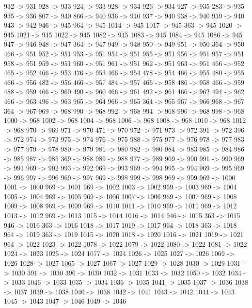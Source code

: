 {	932 -> 931
	928 -> 933
	924 -> 933
	928 -> 934
	926 -> 934
	927 -> 935
	283 -> 935
	935 -> 936
	807 -> 940
	866 -> 940
	936 -> 940
	937 -> 940
	938 -> 940
	939 -> 940
	943 -> 942
	946 -> 945
	964 -> 945
	1014 -> 945
	1017 -> 945
	363 -> 945
	1020 -> 945
	1021 -> 945
	1022 -> 945
	1082 -> 945
	1083 -> 945
	1084 -> 945
	1086 -> 945
	947 -> 946
	948 -> 947
	364 -> 947
	949 -> 948
	950 -> 949
	951 -> 950
	364 -> 950
	466 -> 951
	952 -> 951
	953 -> 951
	954 -> 951
	955 -> 951
	956 -> 951
	957 -> 951
	958 -> 951
	959 -> 951
	960 -> 951
	961 -> 951
	962 -> 951
	963 -> 951
	466 -> 952
	465 -> 952
	466 -> 953
	476 -> 953
	466 -> 954
	478 -> 954
	466 -> 955
	480 -> 955
	466 -> 956
	482 -> 956
	466 -> 957
	484 -> 957
	466 -> 958
	486 -> 958
	466 -> 959
	488 -> 959
	466 -> 960
	490 -> 960
	466 -> 961
	492 -> 961
	466 -> 962
	494 -> 962
	466 -> 963
	496 -> 963
	965 -> 964
	966 -> 965
	364 -> 965
	967 -> 966
	968 -> 967
	364 -> 967
	969 -> 968
	990 -> 968
	992 -> 968
	994 -> 968
	996 -> 968
	998 -> 968
	1000 -> 968
	1002 -> 968
	1004 -> 968
	1006 -> 968
	1008 -> 968
	1010 -> 968
	1012 -> 968
	970 -> 969
	971 -> 970
	471 -> 970
	972 -> 971
	973 -> 972
	391 -> 972
	396 -> 972
	974 -> 973
	975 -> 974
	976 -> 975
	988 -> 975
	977 -> 976
	978 -> 977
	983 -> 977
	979 -> 978
	980 -> 979
	981 -> 980
	982 -> 980
	984 -> 983
	985 -> 984
	986 -> 985
	987 -> 985
	369 -> 988
	989 -> 988
	977 -> 989
	969 -> 990
	991 -> 990
	969 -> 991
	969 -> 992
	993 -> 992
	969 -> 993
	969 -> 994
	995 -> 994
	969 -> 995
	969 -> 996
	997 -> 996
	969 -> 997
	969 -> 998
	999 -> 998
	969 -> 999
	969 -> 1000
	1001 -> 1000
	969 -> 1001
	969 -> 1002
	1003 -> 1002
	969 -> 1003
	969 -> 1004
	1005 -> 1004
	969 -> 1005
	969 -> 1006
	1007 -> 1006
	969 -> 1007
	969 -> 1008
	1009 -> 1008
	969 -> 1009
	969 -> 1010
	1011 -> 1010
	969 -> 1011
	969 -> 1012
	1013 -> 1012
	969 -> 1013
	1015 -> 1014
	1016 -> 1014
	946 -> 1015
	363 -> 1015
	946 -> 1016
	363 -> 1016
	1018 -> 1017
	1019 -> 1017
	964 -> 1018
	363 -> 1018
	964 -> 1019
	363 -> 1019
	1015 -> 1020
	1018 -> 1020
	1016 -> 1021
	1019 -> 1021
	964 -> 1022
	1023 -> 1022
	1078 -> 1022
	1079 -> 1022
	1080 -> 1022
	1081 -> 1022
	1024 -> 1023
	1025 -> 1024
	1077 -> 1024
	1026 -> 1025
	1027 -> 1026
	1069 -> 1026
	1028 -> 1027
	1065 -> 1027
	1067 -> 1027
	1029 -> 1028
	1030 -> 1029
	1031 -> 1030
	391 -> 1030
	396 -> 1030
	1032 -> 1031
	1033 -> 1032
	1050 -> 1032
	1034 -> 1033
	1046 -> 1033
	1035 -> 1034
	1036 -> 1035
	1041 -> 1035
	1037 -> 1036
	1038 -> 1037
	1039 -> 1038
	1040 -> 1038
	1042 -> 1041
	1043 -> 1042
	1044 -> 1043
	1045 -> 1043
	1047 -> 1046
	1049 -> 1046
}
